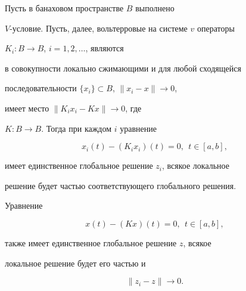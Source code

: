 \begin{thm}


Пусть в банаховом пространстве $B$ выполнено


$V$-условие. Пусть, далее, вольтерровые на системе $v$ операторы


$K_{i}:B \to B$, $i=1, 2, \dotsc$, являются


в совокупности локально сжимающими и для любой сходящейся


последовательности $\{x_i\} \subset B$, $\|x_i -x\|\to0$,


имеет место $\|K_i x_i - K x\|\to 0$, где


$K:B \to B$. Тогда при каждом $i$ уравнение


\begin{equation}\label{5.S.1}


x_i (t)- (K_i x_i) (t)=0,\ \ t\in [a, b],


\end{equation}


имеет единственное глобальное решение $z_i$, всякое локальное


решение будет частью соответствующего глобального решения.


Уравнение


\begin{equation}\label{5.S.2}


x (t)- (K x) (t)=0,\ \ t\in [a, b],


\end{equation}


также имеет единственное глобальное решение $z$, всякое


локальное решение будет его частью и


\begin{equation}\label{5.S.3}


\|z_i -z\|\to 0.


\end{equation}


\end{thm}








